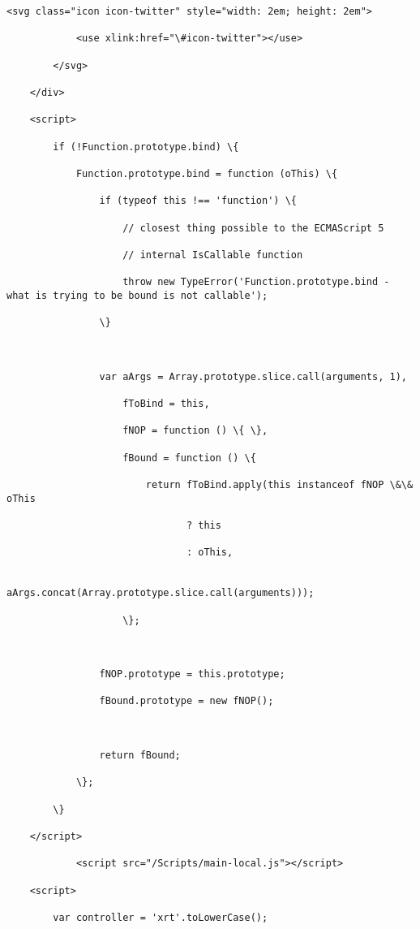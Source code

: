 \documentclass[11pt]{article}
\begin{document}
\begin{Verbatim}[commandchars=\\\{\}]
        <svg class="icon icon-twitter" style="width: 2em; height: 2em">

            <use xlink:href="\#icon-twitter"></use>

        </svg>

    </div>

    <script>

        if (!Function.prototype.bind) \{

            Function.prototype.bind = function (oThis) \{

                if (typeof this !== 'function') \{

                    // closest thing possible to the ECMAScript 5

                    // internal IsCallable function

                    throw new TypeError('Function.prototype.bind - what is trying to be bound is not callable');

                \}



                var aArgs = Array.prototype.slice.call(arguments, 1),

                    fToBind = this,

                    fNOP = function () \{ \},

                    fBound = function () \{

                        return fToBind.apply(this instanceof fNOP \&\& oThis

                               ? this

                               : oThis,

                               aArgs.concat(Array.prototype.slice.call(arguments)));

                    \};



                fNOP.prototype = this.prototype;

                fBound.prototype = new fNOP();



                return fBound;

            \};

        \}

    </script>

            <script src="/Scripts/main-local.js"></script>

    <script>

        var controller = 'xrt'.toLowerCase();


\end{Verbatim}
\end{document}
